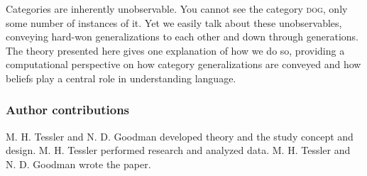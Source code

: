 \documentclass[12pt,letterpaper]{article}
\begin{document}
Categories are inherently unobservable. 
You cannot see the category \textsc{dog}, only some number of instances of it.
Yet we easily talk about these unobservables, conveying hard-won generalizations to each other and down through generations.
The theory presented here gives one explanation of how we do so, providing a computational perspective on how category generalizations are conveyed and how beliefs play a central role in understanding language.

















%

\subsubsection*{Author contributions}
M. H. Tessler and N. D. Goodman developed theory and the study concept and design.
M. H. Tessler performed research and analyzed data.
M. H. Tessler and N. D. Goodman wrote the paper.
\end{document}
